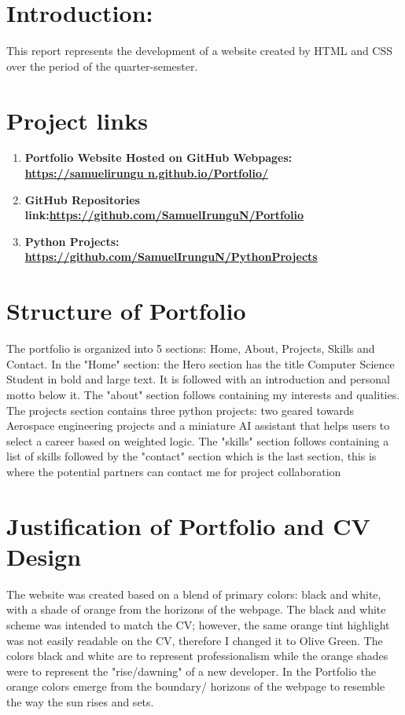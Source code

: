 \documentclass[12pt,a4paper,oneside]{report}
\begin{document}
\section{Introduction:}
This report represents the development of a website created by HTML and CSS over the period of the quarter-semester.

\section{Project links}
\begin{enumerate}
    \item \bf{Portfolio Website Hosted on GitHub Webpages:} \href{https://samuelirungun.github.io/Portfolio/}{https://samuelirungu
    n.github.io/Portfolio/ \faLink}
    \item \bf{GitHub Repositories link:}\href{https://github.com/SamuelIrunguN/Portfolio}{https://github.com/SamuelIrunguN/Portfolio\faLink} 
    \item \bf{Python Projects:} \href{https://github.com/SamuelIrunguN/PythonProjects}{https://github.com/SamuelIrunguN/PythonProjects\faLink}
\end{enumerate}





\section{Structure of Portfolio}
The portfolio is organized into 5 sections: Home, About, Projects, Skills and Contact.
In the "Home" section: the Hero section has the title Computer Science Student in bold and large text. It is followed with an introduction and personal motto below it. 
\noindent
The "about" section follows containing my interests and qualities.
The projects section contains three python projects: two geared towards Aerospace engineering projects and a miniature AI assistant that helps users to select a career based on weighted logic. 
\noindent
The "skills" section follows containing a list of skills followed by the "contact" section which is the last section, this is where the potential partners can contact me for project collaboration 



\section{Justification of Portfolio and CV Design}
The website was created based on a blend of primary colors: black and white, with a shade of orange from the horizons of the webpage. The black and white scheme was intended to match the CV; however, the same orange tint highlight was not easily readable on the CV, therefore I changed it to Olive Green.
\noindent
The colors black and white are to represent professionalism while the orange shades were to represent the "rise/dawning" of a new developer. In the Portfolio the orange colors emerge from the boundary/ horizons of the webpage to resemble the way the sun rises and sets. 
\end{document}
